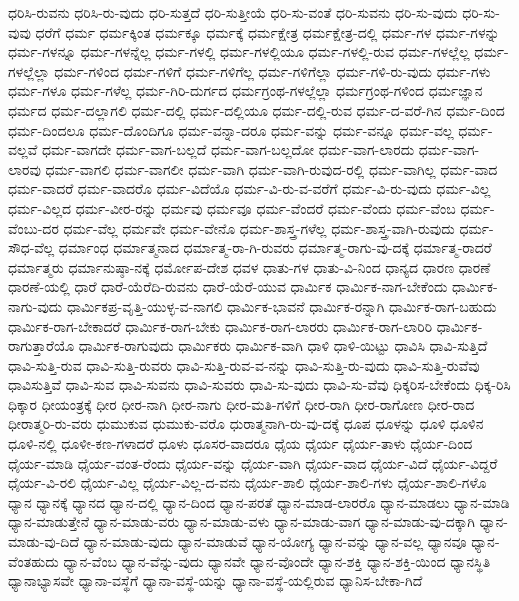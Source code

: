 {ಧರಿಸಿ-ರುವನು
ಧರಿಸಿ-ರು-ವುದು
ಧರಿ-ಸುತ್ತದೆ
ಧರಿ-ಸುತ್ತೀಯೆ
ಧರಿ-ಸು-ವಂತೆ
ಧರಿ-ಸುವನು
ಧರಿ-ಸು-ವುದು
ಧರಿ-ಸು-ವುವು
ಧರೆಗೆ
ಧರ್ಮ
ಧರ್ಮಕ್ಕಿಂತ
ಧರ್ಮಕ್ಕೂ
ಧರ್ಮಕ್ಕೆ
ಧರ್ಮಕ್ಷೇತ್ರ
ಧರ್ಮಕ್ಷೇತ್ರ-ದಲ್ಲಿ
ಧರ್ಮ-ಗಳ
ಧರ್ಮ-ಗಳನ್ನು
ಧರ್ಮ-ಗಳನ್ನೂ
ಧರ್ಮ-ಗಳನ್ನೆಲ್ಲ
ಧರ್ಮ-ಗಳಲ್ಲಿ
ಧರ್ಮ-ಗಳಲ್ಲಿಯೂ
ಧರ್ಮ-ಗಳಲ್ಲಿ-ರುವ
ಧರ್ಮ-ಗಳಲ್ಲೆಲ್ಲ
ಧರ್ಮ-ಗಳಲ್ಲೆಲ್ಲಾ
ಧರ್ಮ-ಗಳಿಂದ
ಧರ್ಮ-ಗಳಿಗೆ
ಧರ್ಮ-ಗಳಿಗೆಲ್ಲ
ಧರ್ಮ-ಗಳಿಗೆಲ್ಲಾ
ಧರ್ಮ-ಗಳಿ-ರು-ವುದು
ಧರ್ಮ-ಗಳು
ಧರ್ಮ-ಗಳೂ
ಧರ್ಮ-ಗಳೆಲ್ಲ
ಧರ್ಮ-ಗಿರಿ-ದುರ್ಗದ
ಧರ್ಮಗ್ರಂಥ-ಗಳಲ್ಲೆಲ್ಲಾ
ಧರ್ಮಗ್ರಂಥ-ಗಳಿಂದ
ಧರ್ಮಜ್ಞಾನ
ಧರ್ಮದ
ಧರ್ಮ-ದಲ್ಲಾಗಲಿ
ಧರ್ಮ-ದಲ್ಲಿ
ಧರ್ಮ-ದಲ್ಲಿಯೂ
ಧರ್ಮ-ದಲ್ಲಿ-ರುವ
ಧರ್ಮ-ದ-ವರೆ-ಗಿನ
ಧರ್ಮ-ದಿಂದ
ಧರ್ಮ-ದಿಂದಲೂ
ಧರ್ಮ-ದೊಂದಿಗೂ
ಧರ್ಮ-ವನ್ನಾ-ದರೂ
ಧರ್ಮ-ವನ್ನು
ಧರ್ಮ-ವನ್ನೂ
ಧರ್ಮ-ವಲ್ಲ
ಧರ್ಮ-ವಲ್ಲವೆ
ಧರ್ಮ-ವಾಗದೇ
ಧರ್ಮ-ವಾಗ-ಬಲ್ಲದೆ
ಧರ್ಮ-ವಾಗ-ಬಲ್ಲದೋ
ಧರ್ಮ-ವಾಗ-ಲಾರದು
ಧರ್ಮ-ವಾಗ-ಲಾರವು
ಧರ್ಮ-ವಾಗಲಿ
ಧರ್ಮ-ವಾಗಲೀ
ಧರ್ಮ-ವಾಗಿ
ಧರ್ಮ-ವಾಗಿ-ರುವುದ-ರಲ್ಲಿ
ಧರ್ಮ-ವಾಗಿಲ್ಲ
ಧರ್ಮ-ವಾದ
ಧರ್ಮ-ವಾದರೆ
ಧರ್ಮ-ವಾದರೊ
ಧರ್ಮ-ವಿದೆಯೊ
ಧರ್ಮ-ವಿ-ರು-ವ-ವರೆಗೆ
ಧರ್ಮ-ವಿ-ರು-ವುದು
ಧರ್ಮ-ವಿಲ್ಲ
ಧರ್ಮ-ವಿಲ್ಲದ
ಧರ್ಮ-ವೀರ-ರನ್ನು
ಧರ್ಮವು
ಧರ್ಮವೂ
ಧರ್ಮ-ವೆಂದರೆ
ಧರ್ಮ-ವೆಂದು
ಧರ್ಮ-ವೆಂಬ
ಧರ್ಮ-ವೆಂಬು-ದರ
ಧರ್ಮ-ವೆಲ್ಲ
ಧರ್ಮವೇ
ಧರ್ಮ-ವೇನೊ
ಧರ್ಮ-ಶಾಸ್ತ್ರ-ಗಳೆಲ್ಲ
ಧರ್ಮ-ಶಾಸ್ತ್ರ-ವಾಗಿ-ರುವುದು
ಧರ್ಮ-ಸೌಧ-ವೆಲ್ಲ
ಧರ್ಮಾಂಧ
ಧರ್ಮಾತ್ಮನಾದ
ಧರ್ಮಾತ್ಮ-ರಾ-ಗಿ-ರುವರು
ಧರ್ಮಾತ್ಮ-ರಾಗು-ವು-ದಕ್ಕೆ
ಧರ್ಮಾತ್ಮ-ರಾದರೆ
ಧರ್ಮಾತ್ಮರು
ಧರ್ಮಾನುಷ್ಠಾ-ನಕ್ಕೆ
ಧರ್ಮೋಪ-ದೇಶ
ಧವಳ
ಧಾತು-ಗಳ
ಧಾತು-ವಿ-ನಿಂದ
ಧಾನ್ಯದ
ಧಾರಣ
ಧಾರಣೆ
ಧಾರಣೆ-ಯಲ್ಲಿ
ಧಾರೆ
ಧಾರೆ-ಯೆರೆದಿ-ರುವನು
ಧಾರೆ-ಯೆರೆ-ಯುವ
ಧಾರ್ಮಿಕ
ಧಾರ್ಮಿಕ-ನಾಗ-ಬೇಕೆಂದು
ಧಾರ್ಮಿಕ-ನಾಗು-ವುದು
ಧಾರ್ಮಿಕಪ್ರ-ವೃತ್ತಿ-ಯುಳ್ಳ-ವ-ನಾಗಲಿ
ಧಾರ್ಮಿಕ-ಭಾವನೆ
ಧಾರ್ಮಿಕ-ರನ್ನಾಗಿ
ಧಾರ್ಮಿಕ-ರಾಗ-ಬಹುದು
ಧಾರ್ಮಿಕ-ರಾಗ-ಬೇಕಾದರೆ
ಧಾರ್ಮಿಕ-ರಾಗ-ಬೇಕು
ಧಾರ್ಮಿಕ-ರಾಗ-ಲಾರರು
ಧಾರ್ಮಿಕ-ರಾಗ-ಲಾರಿರಿ
ಧಾರ್ಮಿಕ-ರಾಗುತ್ತಾರೆಯೊ
ಧಾರ್ಮಿಕ-ರಾಗುವುದು
ಧಾರ್ಮಿಕರು
ಧಾರ್ಮಿಕ-ವಾಗಿ
ಧಾಳಿ
ಧಾಳಿ-ಯಿಟ್ಟು
ಧಾವಿಸಿ
ಧಾವಿ-ಸುತ್ತಿದೆ
ಧಾವಿ-ಸುತ್ತಿ-ರುವ
ಧಾವಿ-ಸುತ್ತಿ-ರುವರು
ಧಾವಿ-ಸುತ್ತಿ-ರುವ-ವ-ನನ್ನು
ಧಾವಿ-ಸುತ್ತಿ-ರು-ವುದು
ಧಾವಿ-ಸುತ್ತಿ-ರುವೆವು
ಧಾವಿಸುತ್ತಿವೆ
ಧಾವಿ-ಸುವ
ಧಾವಿ-ಸುವನು
ಧಾವಿ-ಸುವರು
ಧಾವಿ-ಸು-ವುದು
ಧಾವಿ-ಸು-ವೆವು
ಧಿಕ್ಕರಿಸ-ಬೇಕೆಂದು
ಧಿಕ್ಕ-ರಿಸಿ
ಧಿಕ್ಕಾರ
ಧೀಯಂತ್ರಕ್ಕೆ
ಧೀರ
ಧೀರ-ನಾಗಿ
ಧೀರ-ನಾಗು
ಧೀರ-ಮತಿ-ಗಳಿಗೆ
ಧೀರ-ರಾಗಿ
ಧೀರ-ರಾಗೋಣ
ಧೀರ-ರಾದ
ಧೀರಾತ್ಮರಿ-ರು-ವರು
ಧುಮುಕುವ
ಧುಮುಕು-ವರೊ
ಧುರಾತ್ಮನಾಗಿ-ರು-ವು-ದಕ್ಕೆ
ಧೂಪ
ಧೂಳನ್ನು
ಧೂಳಿ
ಧೂಳಿನ
ಧೂಳಿ-ನಲ್ಲಿ
ಧೂಳೀ-ಕಣ-ಗಳಾದರೆ
ಧೂಳು
ಧೂಸರ-ವಾದರೂ
ಧೈಯ
ಧೈರ್ಯ
ಧೈರ್ಯ-ತಾಳು
ಧೈರ್ಯ-ದಿಂದ
ಧೈರ್ಯ-ಮಾಡಿ
ಧೈರ್ಯ-ವಂತ-ರೆಂದು
ಧೈರ್ಯ-ವನ್ನು
ಧೈರ್ಯ-ವಾಗಿ
ಧೈರ್ಯ-ವಾದ
ಧೈರ್ಯ-ವಿದೆ
ಧೈರ್ಯ-ವಿದ್ದರೆ
ಧೈರ್ಯ-ವಿ-ರಲಿ
ಧೈರ್ಯ-ವಿಲ್ಲ
ಧೈರ್ಯ-ವಿಲ್ಲ-ದ-ವನು
ಧೈರ್ಯ-ಶಾಲಿ
ಧೈರ್ಯ-ಶಾಲಿ-ಗಳು
ಧೈರ್ಯ-ಶಾಲಿ-ಗಳೊ
ಧ್ಯಾನ
ಧ್ಯಾನಕ್ಕೆ
ಧ್ಯಾನದ
ಧ್ಯಾನ-ದಲ್ಲಿ
ಧ್ಯಾನ-ದಿಂದ
ಧ್ಯಾನ-ಪರತೆ
ಧ್ಯಾನ-ಮಾಡ-ಲಾರರೊ
ಧ್ಯಾನ-ಮಾಡಲು
ಧ್ಯಾನ-ಮಾಡಿ
ಧ್ಯಾನ-ಮಾಡುತ್ತೇನೆ
ಧ್ಯಾನ-ಮಾಡು-ವರು
ಧ್ಯಾನ-ಮಾಡು-ವಳು
ಧ್ಯಾನ-ಮಾಡು-ವಾಗ
ಧ್ಯಾನ-ಮಾಡು-ವು-ದಕ್ಕಾಗಿ
ಧ್ಯಾನ-ಮಾಡು-ವು-ದಿದೆ
ಧ್ಯಾನ-ಮಾಡು-ವುದು
ಧ್ಯಾನ-ಮಾಡುವೆ
ಧ್ಯಾನ-ಯೋಗ್ಯ
ಧ್ಯಾನ-ವನ್ನು
ಧ್ಯಾನ-ವಲ್ಲ
ಧ್ಯಾನವೂ
ಧ್ಯಾನ-ವೆಂತಹುದು
ಧ್ಯಾನ-ವೆಂಬ
ಧ್ಯಾನ-ವೆನ್ನು-ವುದು
ಧ್ಯಾನವೇ
ಧ್ಯಾನ-ವೊಂದೇ
ಧ್ಯಾನ-ಶಕ್ತಿ
ಧ್ಯಾನ-ಶಕ್ತಿ-ಯಿಂದ
ಧ್ಯಾನಸ್ಥಿತಿ
ಧ್ಯಾನಾಭ್ಯಾಸವೇ
ಧ್ಯಾನಾ-ವಸ್ಥೆಗೆ
ಧ್ಯಾನಾ-ವಸ್ಥೆ-ಯನ್ನು
ಧ್ಯಾನಾ-ವಸ್ಥೆ-ಯಲ್ಲಿರುವ
ಧ್ಯಾನಿಸ-ಬೇಕಾ-ಗಿದೆ
}

